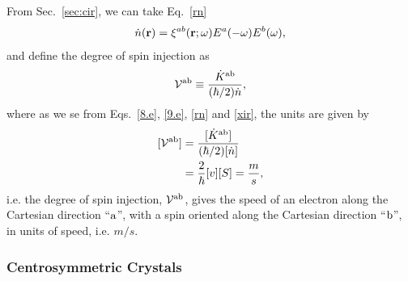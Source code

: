\documentclass[floatfix,prb,aps,superscriptaddress,11pt]{revtex4}
\begin{document}
From Sec.~\ref{sec:cir}, we can take Eq.~\eqref{rn}
\begin{equation}\label{rnn}
\dot n(\mathbf{r})=\xi^{ab}(\mathbf{r};\omega) 
E^a(-\omega) E^b(\omega) 
,
\end{equation}
and define the degree of spin injection as 
\begin{align}\label{eez.1}
{\cal V}^{\mathrm{a}\mathrm{b}}\equiv\frac{\dot K^{\mathrm{a}\mathrm{b}}}{(\hbar/2)\dot n}
,
\end{align}  
where as we se from Eqs.~\eqref{8.e}, \eqref{9.e}, \eqref{rn}  and
\eqref{xir}, the units are given by
\begin{align}\label{eez.2}
[{\cal V}^{\mathrm{a}\mathrm{b}}]
&=
\frac{[\dot K^{\mathrm{a}\mathrm{b}}]}{(\hbar/2)[\dot n]}
\nonumber\\
&=
\frac{2}{\hbar}[v][S]=\frac{m}{s}
,
\end{align}
i.e. the degree of spin injection, ${\cal V}^{\mathrm{a}\mathrm{b}}$,
 gives the speed of an electron along the Cartesian direction
``$\mathrm{a}$'', with a spin oriented along the Cartesian direction ``$\mathrm{b}$'',
in units of speed, i.e. $m/s$.


\subsubsection{Centrosymmetric Crystals}
\end{document}
